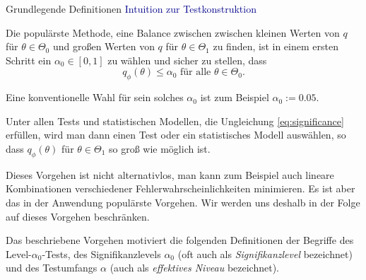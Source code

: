 \documentclass[
  8pt,
  ignorenonframetext,
]{beamer}
\begin{document}
\begin{frame}{Grundlegende Definitionen}
\protect\hypertarget{grundlegende-definitionen-11}{}
\textcolor{darkblue}{Intuition zur Testkonstruktion} \small

Die populärste Methode, eine Balance zwischen zwischen kleinen Werten
von \(q\) für \(\theta \in \Theta_0\) und großen Werten von \(q\) für
\(\theta \in \Theta_1\) zu finden, ist in einem ersten Schritt ein
\(\alpha_0 \in [0,1]\) zu wählen und sicher zu stellen, dass
\begin{equation}\label{eq:significance}
q_\phi(\theta) \le \alpha_0 \mbox{ für alle } \theta \in \Theta_0.
\end{equation}

Eine konventionelle Wahl für sein solches \(\alpha_0\) ist zum Beispiel
\(\alpha_0 := 0.05\).

Unter allen Tests und statistischen Modellen, die Ungleichung
\eqref{eq:significance} erfüllen, wird man dann einen Test oder ein
statistisches Modell auswählen, so dass \(q_\phi(\theta)\) für
\(\theta \in \Theta_1\) so groß wie möglich ist.

Dieses Vorgehen ist nicht alternativlos, man kann zum Beispiel auch
lineare Kombinationen verschiedener Fehlerwahrscheinlichkeiten
minimieren. Es ist aber das in der Anwendung populärste Vorgehen. Wir
werden uns deshalb in der Folge auf dieses Vorgehen beschränken.

Das beschriebene Vorgehen motiviert die folgenden Definitionen der
Begriffe des Level-\(\alpha_0\)-Tests, des Signifikanzlevels
\(\alpha_0\) (oft auch als \emph{Signifikanzlevel} bezeichnet) und des
Testumfangs \(\alpha\) (auch als \emph{effektives Niveau} bezeichnet).
\end{frame}
\end{document}
